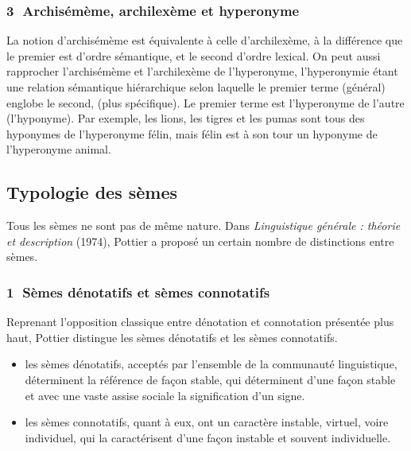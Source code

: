 \subsubsection*{\textcircled{\scriptsize 3} Archisémème, archilexème et hyperonyme}
La notion d’archisémème est équivalente à celle d’archilexème, à la différence que le premier est d’ordre sémantique, et le second d’ordre lexical. On peut aussi rapprocher l’archisémème et l’archilexème de l’hyperonyme, l’hyperonymie étant une relation sémantique hiérarchique selon laquelle le premier terme (général) englobe le second, (plus spécifique). Le premier terme est l’hyperonyme de l’autre (l’hyponyme). Par exemple, les lions, les tigres et les pumas sont tous des hyponymes de l’hyperonyme félin, mais félin est à son tour un hyponyme de l’hyperonyme animal.

\subsection{Typologie des sèmes}
Tous les sèmes ne sont pas de même nature. Dans \textit{Linguistique générale : théorie et description} (1974), Pottier a proposé un certain nombre de distinctions entre sèmes.

\subsubsection*{\textcircled{\scriptsize 1} Sèmes dénotatifs et sèmes connotatifs}
Reprenant l’opposition classique entre dénotation et connotation présentée plus haut, Pottier distingue les sèmes dénotatifs et les sèmes connotatifs.
\begin{itemize}
\item les sèmes dénotatifs, acceptés par l’ensemble de la communauté linguistique, déterminent la référence de façon stable, qui déterminent d’une façon stable et avec une vaste assise sociale la signification d’un signe.
\item les sèmes connotatifs, quant à eux, ont un caractère instable, virtuel, voire individuel, qui la caractérisent d’une façon instable et souvent individuelle.
\end{itemize}


